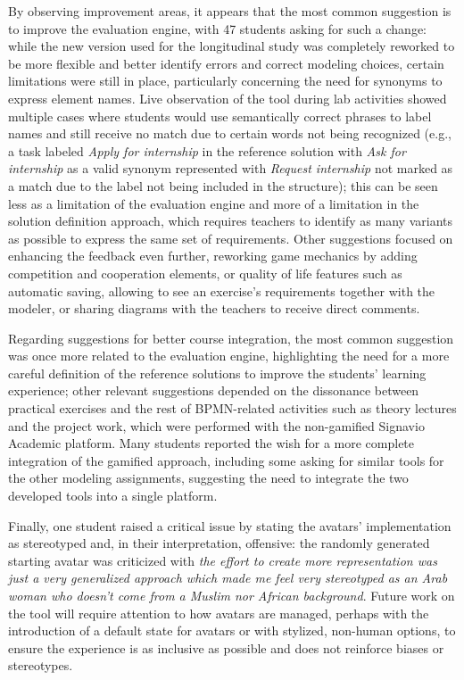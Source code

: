 By observing improvement areas, it appears that the most common suggestion is to improve the evaluation engine, with 47 students asking for such a change: while the new version used for the longitudinal study was completely reworked to be more flexible and better identify errors and correct modeling choices, certain limitations were still in place, particularly concerning the need for synonyms to express element names. Live observation of the tool during lab activities showed multiple cases where students would use semantically correct phrases to label names and still receive no match due to certain words not being recognized (e.g., a task labeled \textit{Apply for internship} in the reference solution with \textit{Ask for internship} as a valid synonym represented with \textit{Request internship} not marked as a match due to the label not being included in the structure); this can be seen less as a limitation of the evaluation engine and more of a limitation in the solution definition approach, which requires teachers to identify as many variants as possible to express the same set of requirements. Other suggestions focused on enhancing the feedback even further, reworking game mechanics by adding competition and cooperation elements, or quality of life features such as automatic saving, allowing to see an exercise's requirements together with the modeler, or sharing diagrams with the teachers to receive direct comments.

Regarding suggestions for better course integration, the most common suggestion was once more related to the evaluation engine, highlighting the need for a more careful definition of the reference solutions to improve the students' learning experience; other relevant suggestions depended on the dissonance between practical exercises and the rest of BPMN-related activities such as theory lectures and the project work, which were performed with the non-gamified Signavio Academic platform. Many students reported the wish for a more complete integration of the gamified approach, including some asking for similar tools for the other modeling assignments, suggesting the need to integrate the two developed tools into a single platform.

Finally, one student raised a critical issue by stating the avatars' implementation as stereotyped and, in their interpretation, offensive: the randomly generated starting avatar was criticized with \textit{the effort to create more representation was just a very generalized approach which made me feel very stereotyped as an Arab woman who doesn't come from a Muslim nor African background}. Future work on the tool will require attention to how avatars are managed, perhaps with the introduction of a default state for avatars or with stylized, non-human options, to ensure the experience is as inclusive as possible and does not reinforce biases or stereotypes.

